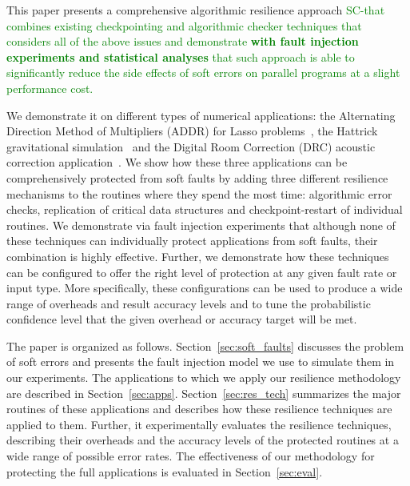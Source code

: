 \documentclass{sig-alternate}
\newcommand{\sui}[1]{%
  \textcolor{green}{SC-#1}
}
\newcommand{\greg}[1]{%
  \textcolor{blue}{GB: #1}
}
\begin{document}
This paper presents a comprehensive algorithmic resilience approach \sui{that combines existing checkpointing and algorithmic checker techniques that considers all of the above issues and demonstrate {\bf with fault injection experiments and statistical analyses} that such approach is able to significantly reduce the side effects of soft errors on parallel programs at a  slight performance cost.}
We demonstrate it on different types of numerical applications: the Alternating Direction Method of Multipliers (ADDR) for Lasso problems~\cite{lasso:2011}, the Hattrick gravitational simulation~\cite{hattrick:2012} and the Digital Room Correction (DRC) acoustic correction application~\cite{drc:2012}.
We show how these three applications can be comprehensively protected from soft faults by adding three different resilience mechanisms to the routines where they spend the most time: algorithmic error checks, replication of critical data structures and checkpoint-restart of individual routines.
We demonstrate via fault injection experiments that although none of these techniques can individually protect applications from soft faults, their combination is highly effective.
Further, we demonstrate how these techniques can be configured to offer the right level of protection at any given fault rate or input type.
More specifically, these configurations can be used to produce a wide range of overheads and result accuracy levels and to tune the probabilistic confidence level that the given overhead or accuracy target will be met.

The paper is organized as follows.
Section~\ref{sec:soft_faults} discusses the problem of soft errors and presents the fault injection model we use to simulate them in our experiments.
The applications to which we apply our resilience methodology are described in Section~\ref{sec:apps}.
Section~\ref{sec:res_tech} summarizes the major routines of these applications and describes how these resilience techniques are applied to them.
Further, it experimentally evaluates the resilience techniques, describing their overheads and the accuracy levels of the protected routines at a wide range of possible error rates.
The effectiveness of our methodology for protecting the full applications is evaluated in Section~\ref{sec:eval}.
\end{document}

